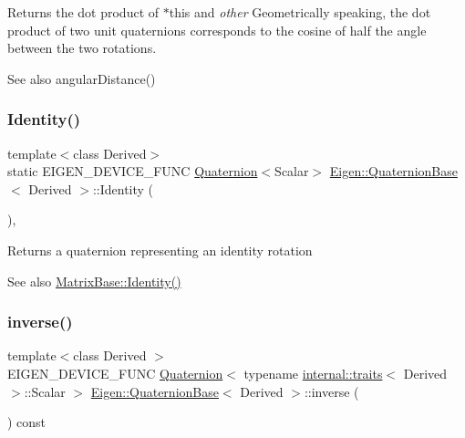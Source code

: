 \begin{DoxyReturn}{Returns}
the dot product of {\ttfamily $\ast$this} and {\itshape other} Geometrically speaking, the dot product of two unit quaternions corresponds to the cosine of half the angle between the two rotations. 
\end{DoxyReturn}
\begin{DoxySeeAlso}{See also}
angular\+Distance() 
\end{DoxySeeAlso}
\mbox{\label{class_eigen_1_1_quaternion_base_a2e095881344a2538041df4fea938b2e0}} 
\subsubsection{\texorpdfstring{Identity()}{Identity()}}
{\footnotesize\ttfamily template$<$class Derived$>$ \\
static E\+I\+G\+E\+N\+\_\+\+D\+E\+V\+I\+C\+E\+\_\+\+F\+U\+NC \mbox{\hyperlink{class_eigen_1_1_quaternion}{Quaternion}}$<$Scalar$>$ \mbox{\hyperlink{class_eigen_1_1_quaternion_base}{Eigen\+::\+Quaternion\+Base}}$<$ Derived $>$\+::Identity (\begin{DoxyParamCaption}{ }\end{DoxyParamCaption})\hspace{0.3cm}{\ttfamily [inline]}, {\ttfamily [static]}}

\begin{DoxyReturn}{Returns}
a quaternion representing an identity rotation 
\end{DoxyReturn}
\begin{DoxySeeAlso}{See also}
\mbox{\hyperlink{class_eigen_1_1_matrix_base_a2ef43190f3aba0aef0cf1030d46d0ca7}{Matrix\+Base\+::\+Identity()}} 
\end{DoxySeeAlso}
\mbox{\label{class_eigen_1_1_quaternion_base_a6a1d8af1fe34cb4127f705c0d10ef649}} 
\subsubsection{\texorpdfstring{inverse()}{inverse()}}
{\footnotesize\ttfamily template$<$class Derived $>$ \\
E\+I\+G\+E\+N\+\_\+\+D\+E\+V\+I\+C\+E\+\_\+\+F\+U\+NC \mbox{\hyperlink{class_eigen_1_1_quaternion}{Quaternion}}$<$ typename \mbox{\hyperlink{struct_eigen_1_1internal_1_1traits}{internal\+::traits}}$<$ Derived $>$\+::Scalar $>$ \mbox{\hyperlink{class_eigen_1_1_quaternion_base}{Eigen\+::\+Quaternion\+Base}}$<$ Derived $>$\+::inverse (\begin{DoxyParamCaption}{ }\end{DoxyParamCaption}) const\hspace{0.3cm}{\ttfamily [inline]}}

